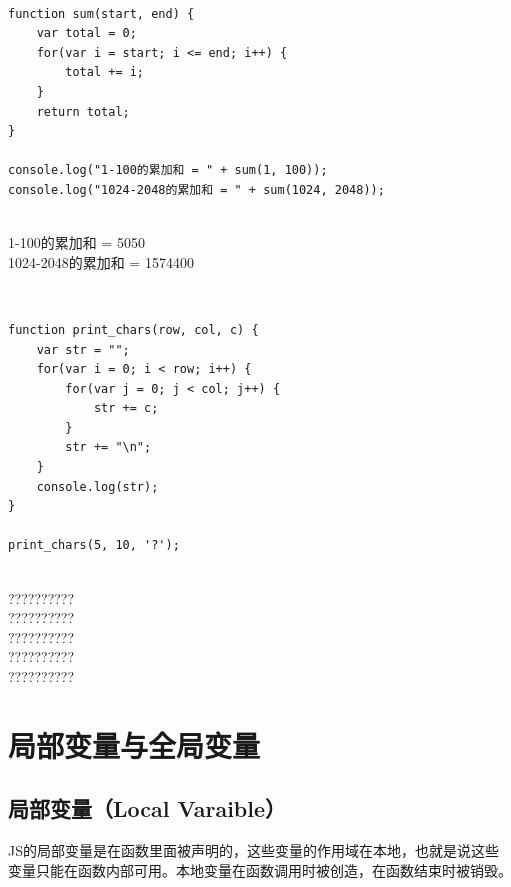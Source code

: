  \\

\begin{lstlisting}[style=htmlcssjs]
function sum(start, end) {
    var total = 0;
    for(var i = start; i <= end; i++) {
        total += i;
    }
    return total;
}

console.log("1-100的累加和 = " + sum(1, 100));
console.log("1024-2048的累加和 = " + sum(1024, 2048));
\end{lstlisting}

\begin{tcolorbox}
	 \\
	1-100的累加和 = 5050 \\
	1024-2048的累加和 = 1574400
\end{tcolorbox}

 \\

\begin{lstlisting}[style=htmlcssjs]
function print_chars(row, col, c) {
    var str = "";
    for(var i = 0; i < row; i++) {
        for(var j = 0; j < col; j++) {
            str += c;
        }
        str += "\n";
    }
    console.log(str);
}

print_chars(5, 10, '?');
\end{lstlisting}

\begin{tcolorbox}
	 \\
	?????????? \\
	?????????? \\
	?????????? \\
	?????????? \\
	??????????
\end{tcolorbox}

\newpage

\section{局部变量与全局变量}

\subsection{局部变量（Local Varaible）}

JS的局部变量是在函数里面被声明的，这些变量的作用域在本地，也就是说这些变量只能在函数内部可用。本地变量在函数调用时被创造，在函数结束时被销毁。 \\

